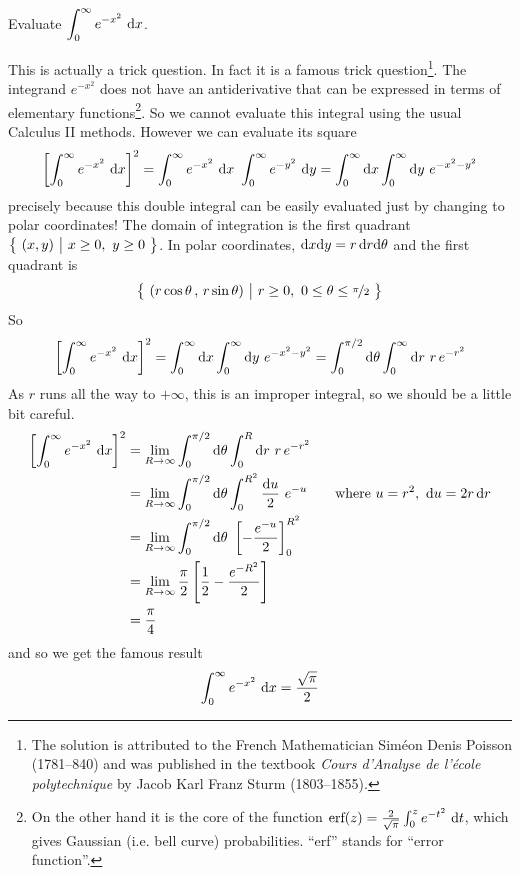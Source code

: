 \begin{eg}\label{eg change to polar B}
Evaluate $\displaystyle\int_0^\infty e^{-x^2}\ \dee{x}$.

\soln
This is actually a trick question. In fact it is a famous trick 
question\footnote{The solution is attributed to the French Mathematician
Sim\'eon Denis Poisson (1781--840) and was published in the textbook
\emph{Cours d'Analyse de l'\'ecole polytechnique} by 
Jacob Karl Franz Sturm (1803--1855).}.
The integrand $e^{-x^2}$ does not have an antiderivative that can 
be expressed in terms of elementary functions\footnote{On the other hand it is the core of the function 
$\text{erf}(z)=\frac{2}{\sqrt{\pi}}\int_0^z e^{-t^2}\ \mathrm{d}t$, which 
gives Gaussian (i.e. bell curve) probabilities.
``erf'' stands for ``error function''.}.
So we cannot evaluate this integral using the usual Calculus II methods. 
However we can evaluate its square
\begin{align*}
\left[\int_0^\infty e^{-x^2}\ \mathrm{d}x\right]^2
=\int_0^\infty e^{-x^2}\ \mathrm{d}x\   \int_0^\infty e^{-y^2}\ \mathrm{d}y
=\int_0^\infty \mathrm{d}x \int_0^\infty \mathrm{d}y\ e^{-x^2-y^2}
\end{align*}
precisely because this double integral can be easily 
evaluated just by changing to polar coordinates!
The domain of integration is the first quadrant
$\big\{ \ (x,y)\ \big|\ x\ge 0,\ y\ge 0\ \big\}$. In polar coordinates, 
$\mathrm{d}x\mathrm{d}y = r\,\mathrm{d}r\mathrm{d}\theta$ and the first  quadrant is 
\begin{equation*}
\Set{(r\cos\theta\,,\,r\sin\theta)}{r\ge 0,\ 0\le\theta\le \nicefrac{\pi}{2}}
\end{equation*}
So
\begin{align*}
\left[\int_0^\infty e^{-x^2}\ \mathrm{d}x\right]^2
=\int_0^\infty\mathrm{d}x\int_0^\infty\mathrm{d}y\ e^{-x^2-y^2}
=\int_0^{\pi/2}\mathrm{d}\theta\int_0^\infty \mathrm{d}r\ r\, e^{-r^2}
\end{align*}
As $r$ runs all the way to $+\infty$, this is an improper integral,
so we should be a little bit careful.
\begin{align*}
\left[\int_0^\infty e^{-x^2}\ \mathrm{d}x\right]^2
&=\lim_{R\rightarrow\infty}
            \int_0^{\pi/2}\mathrm{d}\theta\int_0^R \mathrm{d}r\ r\, e^{-r^2} \\
&=\lim_{R\rightarrow\infty}
    \int_0^{\pi/2}\mathrm{d}\theta\int_0^{R^2} \frac{\mathrm{d}u}{2}\ e^{-u} \qquad
   \text{where } u= r^2,\ \mathrm{d}u =2r\,\mathrm{d}r \\
&=\lim_{R\rightarrow\infty}
    \int_0^{\pi/2}\mathrm{d}\theta\ \left[-\frac{e^{-u}}{2}\right]_0^{R^2} \\
&=\lim_{R\rightarrow\infty} \frac{\pi}{2}                  
                 \left[\frac{1}{2}-\frac{e^{-R^2}}{2}\right] \\
&=\frac{\pi}{4}
\end{align*}
and so we get the famous result
\begin{align*}
\int_0^\infty e^{-x^2}\ \mathrm{d}x =\frac{\sqrt{\pi}}{2}
\end{align*}


\end{eg}
